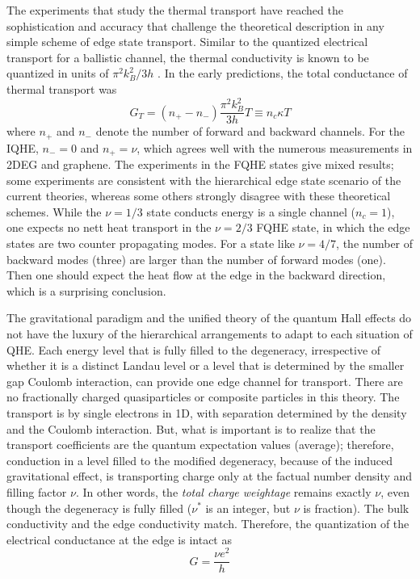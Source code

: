 \documentclass[aps,preprint,12pt,tightenlines]{revtex4}%
\begin{document}
The experiments that study the thermal transport have reached the
sophistication and accuracy that challenge the theoretical description in any
simple scheme of edge state transport. Similar to the quantized electrical
transport for a ballistic channel, the thermal conductivity is known to be
quantized in units of $\pi^{2}k_{B}^{2}/3h$ \cite{Kane-Fisher}. In the early
predictions, the total conductance of thermal transport was
\begin{equation}
G_{T}=\left(  n_{+}-n_{-}\right)  \frac{\pi^{2}k_{B}^{2}}{3h}T\equiv
n_{c}\kappa T
\end{equation}
where $n_{+}$ and $n_{-}$ denote the number of forward and backward channels.
For the IQHE, $n_{-}=0$ and $n_{+}=\nu$, which agrees well with the numerous
measurements in 2DEG and graphene. The experiments in the FQHE states give
mixed results; some experiments are consistent with the hierarchical edge
state scenario of the current theories, whereas some others strongly disagree
with these theoretical schemes. While the $\nu=1/3$ state conducts energy is a
single channel ($n_{c}=1$), one expects no nett heat transport in the
$\nu=2/3$ FQHE state, in which the edge states are two counter propagating
modes. For a state like $\nu=4/7$, the number of backward modes (three) are
larger than the number of forward modes (one). Then one should expect the heat
flow at the edge in the backward direction, which is a surprising conclusion.


The gravitational paradigm and the unified theory of the quantum Hall effects
do not have the luxury of the hierarchical arrangements to adapt to each
situation of QHE. Each energy level that is fully filled to the degeneracy,
irrespective of whether it is a distinct Landau level or a level that is
determined by the smaller gap Coulomb interaction, can provide one edge
channel for transport. There are no fractionally charged quasiparticles or
composite particles in this theory. The transport is by single electrons in
1D, with separation determined by the density and the Coulomb interaction.
But, what is important is to realize that the transport coefficients are the
quantum expectation values (average); therefore, conduction in a level filled
to the modified degeneracy, because of the induced gravitational effect, is
transporting charge only at the factual number density and filling factor
$\nu$. In other words, the \emph{total charge weightage} remains exactly $\nu
$, even though the degeneracy is fully filled ($\nu^{\ast}$ is an integer, but
$\nu$ is fraction). The bulk conductivity and the edge conductivity match.
Therefore, the quantization of the electrical conductance at the edge is
intact as
\begin{equation}
G=\frac{\nu e^{2}}{h}%
\end{equation}
\end{document}
